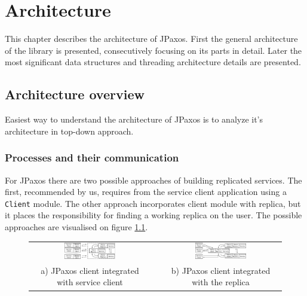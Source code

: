\chapter{Architecture}

This chapter describes the architecture of JPaxos.
First the general architecture of the library is presented, consecutively focusing on its parts in detail.
Later the most significant data structures and threading architecture details are presented.

\section{Architecture overview}
\indent\par
Easiest way to understand the architecture of JPaxos is to analyze it's architecture in top-down approach.

\subsection{Processes and their communication}

For JPaxos there are two possible approaches of building replicated services. The first, recommended by us, requires from the service client application using a \texttt{Client} module. The other approach incorporates client module with replica, but it places the responsibility for finding a working replica on the user. The possible approaches are visualised on figure \ref{fig:jpaxos_processes}.

\begin{figure}[h]
 \begin{tabular}{ccc}
  \includegraphics[width=0.44\textwidth]{architecture/userArchitecture1.pdf}
  &
  \hspace{0.02\textwidth}
  &
  \includegraphics[width=0.44\textwidth]{architecture/userArchitecture2.pdf}
  \\ 
  \scriptsize a) JPaxos client integrated with service client
  & & 
  \scriptsize b) JPaxos client integrated with the replica\\
 \end{tabular}
 \label{fig:jpaxos_processes}
\end{figure}

